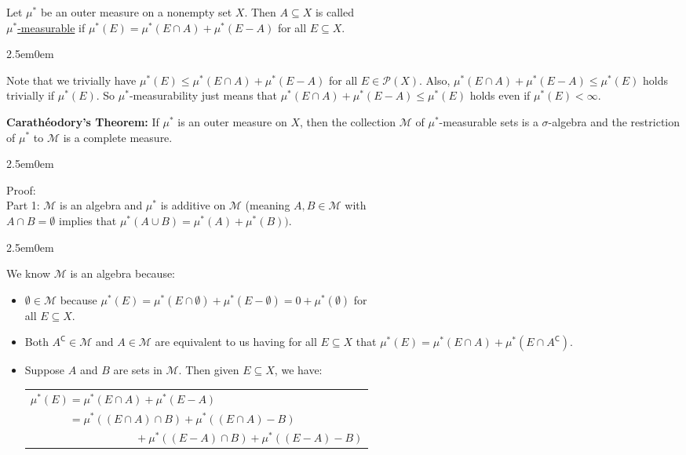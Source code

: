 \documentclass{book}
\newcommand{\hTwo}{%
\color{MidnightBlue}%
   \fontsize{13}{15}\selectfont%
}
\newcommand{\hThree}{%
   \color{PineGreen!85!Orange}
   \fontsize{12}{14}\selectfont%
}
\newcommand{\hFour}{%
   \color{Cyan!80!black}
   \fontsize{12}{14}\selectfont%
}
\newcommand{\teachComment}{
   \color{Orange}%
   \fontsize{12}{14}\selectfont%
}
\newenvironment{myIndent}{%
   \begin{adjustwidth}{2.5em}{0em}%
}{%
   \end{adjustwidth}%
}
\newcommand{\udefine}[1]{{%
   \setulcolor{Red}%
   \setul{0.14em}{0.07em}%
   \ul{#1}%
}}
\newcommand{\blab}[1]{\textbf{#1}}
\newcommand{\comp}{\mathsf{C}}
\newcommand{\retTwo}{\hfill\bigbreak}
\begin{document}
Let $\mu^*$ be an outer measure on a nonempty set $X$. Then $A \subseteq X$ is called\\ \udefine{$\mu^*$-measurable} if $\mu^*(E) = \mu^*(E \cap A) + \mu^*(E - A)$ for all $E \subseteq X$.
\begin{myIndent}\teachComment
   Note that we trivially have $\mu^*(E) \leq \mu^*(E \cap A) + \mu^*(E - A)$ for all $E \in \mathcal{P}(X)$. Also, $\mu^*(E \cap A) + \mu^*(E - A) \leq \mu^*(E)$ holds trivially if $\mu^*(E)$. So $\mu^*$-measurability just means that $\mu^*(E \cap A) + \mu^*(E - A) \leq \mu^*(E)$ holds even if $\mu^*(E) < \infty$.\retTwo

   \hTwo\blab{Carathéodory's Theorem:} If $\mu^*$ is an outer measure on $X$, then the collection $\mathcal{M}$ of $\mu^*$-measurable sets is a $\sigma$-algebra and the restriction of $\mu^*$ to $\mathcal{M}$ is a complete measure.
   
   \begin{myIndent}\hThree
      Proof:\\
      Part 1: $\mathcal{M}$ is an algebra and $\mu^*$ is additive on $\mathcal{M}$ (meaning $A, B \in \mathcal{M}$ with\\ $A \cap B = \emptyset$ implies that $\mu^*(A \cup B) = \mu^*(A) + \mu^*(B))$.
      
      \begin{myIndent}\hFour
         We know $\mathcal{M}$ is an algebra because:
         \begin{itemize}
            \item $\emptyset \in \mathcal{M}$ because $\mu^*(E) = \mu^*(E \cap \emptyset) + \mu^*(E - \emptyset) = 0 + \mu^*(\emptyset)$ for\\ all $E \subseteq X$.\newpage
            \item Both $A^\comp \in \mathcal{M}$ and $A \in \mathcal{M}$ are equivalent to us having for all $E \subseteq X$ that $\mu^*(E) = \mu^*(E \cap A) + \mu^*(E \cap A^\comp)$.\\ [-6pt]
            \item Suppose $A$ and $B$ are sets in $\mathcal{M}$. Then given $E \subseteq X$, we have:
            
            {\centering 
            \begin{tabular}{l}
               $\mu^*(E) = \mu^*(E \cap A) + \mu^*(E - A)$\\
               $\phantom{\mu^*(E)} = \mu^*((E \cap A) \cap B) + \mu^*((E \cap A) - B)$\\ $\phantom{aaaaaaaaaaaaaaaaaa} + \mu^*((E - A) \cap B) + \mu^*((E - A) - B)$
            \end{tabular} \retTwo\par}


\end{itemize}
\end{myIndent}
\end{myIndent}
\end{myIndent}
\end{document}
